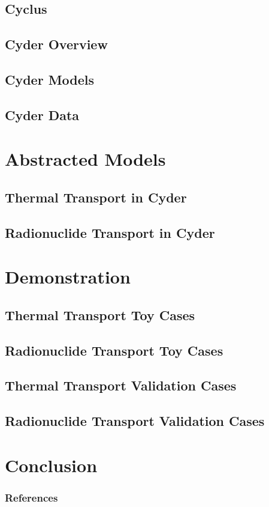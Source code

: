 \documentclass[9pt]{beamer}
\begin{document}
\subsection{Cyclus}

\subsection{Cyder Overview}

\subsection{Cyder Models}

\subsection{Cyder Data}


\section{Abstracted Models}

\subsection{Thermal Transport in Cyder}

\subsection{Radionuclide Transport in Cyder}


\section{Demonstration}

\subsection{Thermal Transport Toy Cases}

\subsection{Radionuclide Transport Toy Cases}

\subsection{Thermal Transport Validation Cases}

\subsection{Radionuclide Transport Validation Cases}


\section{Conclusion}

\begin{frame}[allowframebreaks]
  \frametitle{References}
  
  {\footnotesize  }

\end{frame}

\end{document}
